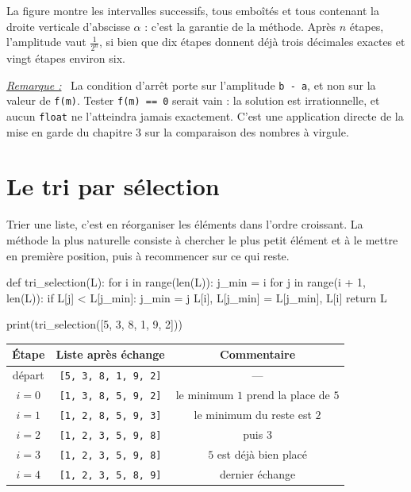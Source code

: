 \documentclass[a4paper,11pt,openany]{book}
\newcommand{\code}[1]{\texttt{\textcolor{codebleu}{#1}}}
\newenvironment{remarque}%
 {\par\vspace{1mm}\begin{list}{}{\leftmargin=1cm \rightmargin=0.5cm}\item[]%
  \textit{\underline{Remarque :}}~}%
 {\end{list}\vspace{1mm}}
\renewcommand{\arraystretch}{1.4}
\begin{document}
La figure montre les intervalles successifs, tous emboîtés et tous contenant la droite verticale d'abscisse $\alpha$ : c'est la garantie de la méthode. Après $n$ étapes, l'amplitude vaut $\frac{1}{2^n}$, si bien que dix étapes donnent déjà trois décimales exactes et vingt étapes environ six.

\begin{remarque}
La condition d'arrêt porte sur l'amplitude \code{b - a}, et non sur la valeur de \code{f(m)}. Tester \code{f(m) == 0} serait vain : la solution est irrationnelle, et aucun \code{float} ne l'atteindra jamais exactement. C'est une application directe de la mise en garde du chapitre 3 sur la comparaison des nombres à virgule.
\end{remarque}

\section{Le tri par sélection}

Trier une liste, c'est en réorganiser les éléments dans l'ordre croissant. La méthode la plus naturelle consiste à chercher le plus petit élément et à le mettre en première position, puis à recommencer sur ce qui reste.

\begin{python}
def tri_selection(L):
    for i in range(len(L)):
        j_min = i
        for j in range(i + 1, len(L)):
            if L[j] < L[j_min]:
                j_min = j
        L[i], L[j_min] = L[j_min], L[i]
    return L

print(tri_selection([5, 3, 8, 1, 9, 2]))
\end{python}

\begin{center}
\renewcommand{\arraystretch}{1.4}
\begin{tabular}{|c|c|c|}
\hline
\rowcolor{orange!50} \textbf{Étape} & \textbf{Liste après échange} & \textbf{Commentaire} \\
\hline
départ & \code{[5, 3, 8, 1, 9, 2]} & --- \\
\hline
$i = 0$ & \code{[1, 3, 8, 5, 9, 2]} & le minimum $1$ prend la place de $5$ \\
\hline
$i = 1$ & \code{[1, 2, 8, 5, 9, 3]} & le minimum du reste est $2$ \\
\hline
$i = 2$ & \code{[1, 2, 3, 5, 9, 8]} & puis $3$ \\
\hline
$i = 3$ & \code{[1, 2, 3, 5, 9, 8]} & $5$ est déjà bien placé \\
\hline
$i = 4$ & \code{[1, 2, 3, 5, 8, 9]} & dernier échange \\
\hline
\end{tabular}
\end{center}
\end{document}
